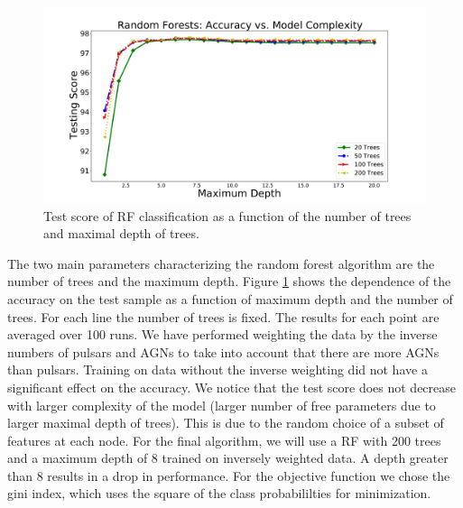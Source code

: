 \begin{figure}[h]
\includegraphics[width=\twopicsp\textwidth]{plots/rf_train}
\caption{
Test score of RF classification as a function of the number of trees and maximal depth of trees.
}
\label{fig:RF_complexity}
\end{figure}

The two main parameters characterizing the random forest algorithm are the number of trees and the maximum depth. 
Figure \ref{fig:RF_complexity} shows the dependence of the accuracy on the test sample as a function of maximum depth and the number of trees. For each line the number of trees is fixed.
The results for each point are averaged over 100 runs.
We have performed weighting the data by the inverse numbers of pulsars and AGNs to take into account that there are more AGNs than pulsars. Training on data without the inverse weighting did not have a significant effect on the accuracy.
We notice that the test score does not decrease with larger complexity of the model 
(larger number of free parameters due to larger maximal depth of trees).
This is due to the random choice of a subset of features at each node.
For the final algorithm, we will use a RF with 200 trees and a maximum depth of 8 trained on inversely weighted data. A depth greater than 8 results in a drop in performance. For the objective function we chose the gini index, which uses the square of the class probabililties for minimization.\\

